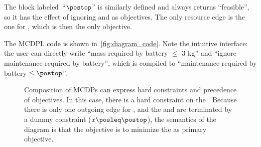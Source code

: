 \smallskip{}

\noindent The block labeled~``$\postop$'' is similarly defined and
always returns ``feasible'', so it has the effect of ignoring 
and  as objectives. The only resource edge is the
one for , which is then the only objective.

The MCDPL code is shown in~\cref{fig:diagram_code}. Note the intuitive
interface: the user can directly write ``mass required by battery
$\leq$ 3 kg'' and ``ignore maintenance required by battery'',
which is compiled to ``maintenance required by battery $\leq\postop$''.

\begin{figure}
  \begin{centering}
  \end{centering}
  \begin{centering}
  \end{centering}
  \smallskip{}

  \caption{Composition of MCDPs can express hard constraints and precedence of
  objectives. In this case, there is a hard constraint on the .
  Because there is only one outgoing edge for , and the 
  and  are terminated by a dummy constraint ($x\posleq\postop$),
    the semantics of the diagram is that the objective is to minimize
    the  as primary objective.}
\end{figure}

